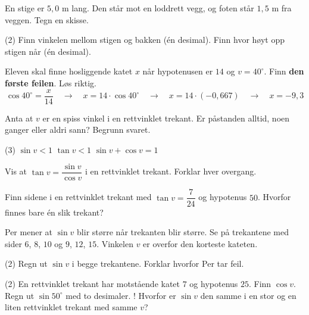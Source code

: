 En stige er $5,0$ m lang. Den står mot en loddrett vegg, og foten står $1,5$ m fra veggen. Tegn en skisse.
\begin{tasks}(2)
  \task Finn vinkelen mellom stigen og bakken (én desimal).
  \task Finn hvor høyt opp stigen når (én desimal).
\end{tasks}

Eleven skal finne hosliggende katet $x$ når hypotenusen er $14$ og $v = 40^\circ$. Finn \textbf{den første feilen}. Løs riktig.
\[ \cos 40^\circ = \frac{x}{14} \quad\longrightarrow\quad x = 14 \cdot \cos 40^\circ \quad\longrightarrow\quad x = 14 \cdot (-0,667) \quad\longrightarrow\quad x = -9,3 \]


Anta at $v$ er en spiss vinkel i en rettvinklet trekant. Er påstanden alltid, noen ganger eller aldri sann? Begrunn svaret.
\begin{tasks}(3)
  \task $\sin v < 1$
  \task $\tan v < 1$
  \task $\sin v + \cos v = 1$
\end{tasks}

Vis at $\tan v = \dfrac{\sin v}{\cos v}$ i en rettvinklet trekant. Forklar hver overgang.

Finn sidene i en rettvinklet trekant med $\tan v = \dfrac{7}{24}$ og hypotenus $50$. Hvorfor finnes bare én slik trekant?

Per mener at $\sin v$ blir større når trekanten blir større. Se på trekantene med sider $6$, $8$, $10$ og $9$, $12$, $15$. Vinkelen $v$ er overfor den korteste kateten.
\begin{tasks}(2)
  \task Regn ut $\sin v$ i begge trekantene.
  \task Forklar hvorfor Per tar feil.
\end{tasks}

\begin{sjekk}
\begin{tasks}(2)
  \task En rettvinklet trekant har motstående katet $7$ og hypotenus $25$. Finn $\cos v$.
  \task Regn ut $\sin 50^\circ$ med to desimaler.
  \task! Hvorfor er $\sin v$ den samme i en stor og en liten rettvinklet trekant med samme $v$?
\end{tasks}
\end{sjekk}



